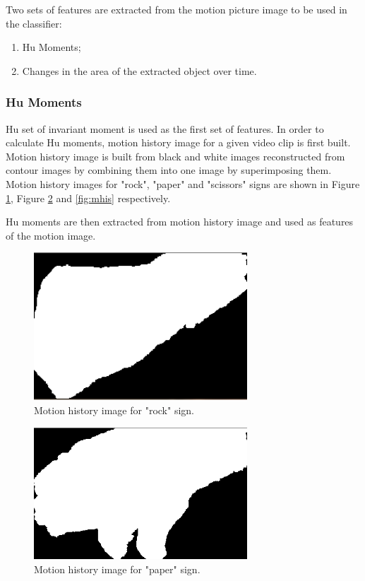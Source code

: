 Two sets of features are extracted from the motion picture image to be used in the classifier:

\begin{enumerate}
\item Hu Moments;
\item Changes in the area of the extracted object over time.
\end{enumerate}

\subsubsection*{Hu Moments}

Hu set of invariant moment is used as the first set of features. In order to calculate Hu moments, motion history image for a given video clip is first built. Motion history image is built from black and white images reconstructed from contour images by combining them into one image by superimposing them. Motion history images for "rock", "paper" and "scissors" signs are shown in Figure \ref{fig:mhir}, Figure \ref{fig:mhip} and \ref{fig:mhis} respectively. 

Hu moments are then extracted from motion history image and used as features of the motion image.

\begin{figure}
\begin{center}
\includegraphics[width=80mm]{mhi_rock.png}
\caption{Motion history image for "rock" sign.}
\label{fig:mhir}
\end{center}
\end{figure}

\begin{figure}
\begin{center}
\includegraphics[width=80mm]{mhi_paper.png}
\caption{Motion history image for "paper" sign.}
\label{fig:mhip}
\end{center}
\end{figure}

